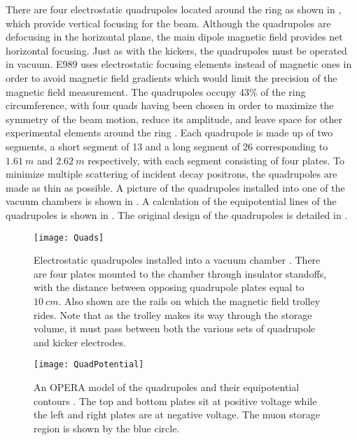 There are four electrostatic quadrupoles located around the ring as shown in , which provide vertical focusing for the beam. Although the quadrupoles are defocusing in the horizontal plane, the main dipole magnetic field provides net horizontal focusing. Just as with the kickers, the quadrupoles must be operated in vacuum. E989 uses electrostatic focusing elements instead of magnetic ones in order to avoid magnetic field gradients which would limit the precision of the magnetic field measurement. The quadrupoles occupy 43\% of the ring circumference, with four quads having been chosen in order to maximize the symmetry of the beam motion, reduce its amplitude, and leave space for other experimental elements around the ring \cite{TDR}. Each quadrupole is made up of two segments, a short segment of 13\textdegree{} and a long segment of 26\textdegree{} corresponding to $\SI{1.61}{m}$ and $\SI{2.62}{m}$ respectively, with each segment consisting of four plates. To minimize multiple scattering of incident decay positrons, the quadrupoles are made as thin as possible. A picture of the quadrupoles installed into one of the vacuum chambers is shown in . A calculation of the equipotential lines of the quadrupoles is shown in . The original design of the quadrupoles is detailed in .

\begin{figure}
    \centering
    \texttt{[image: Quads]}
    \caption[Electrostatic quadrupoles installed in a vacuum chamber]{Electrostatic quadrupoles installed into a vacuum chamber \cite{QuadsE821}. There are four plates mounted to the chamber through insulator standoffs, with the distance between opposing quadrupole plates equal to $\SI{10}{cm}$. Also shown are the rails on which the magnetic field trolley rides. Note that as the trolley makes its way through the storage volume, it must pass between both the various sets of quadrupole and kicker electrodes.}
    \label{fig:Quads}
\end{figure}

\begin{figure}
    \centering
    \texttt{[image: QuadPotential]}
    \caption[Electrostatic quadrupole potentials]{An OPERA model of the quadrupoles and their equipotential contours \cite{TDR}. The top and bottom plates sit at positive voltage while the left and right plates are at negative voltage. The muon storage region is shown by the blue circle.}   
    \label{fig:QuadPotential}
\end{figure}


